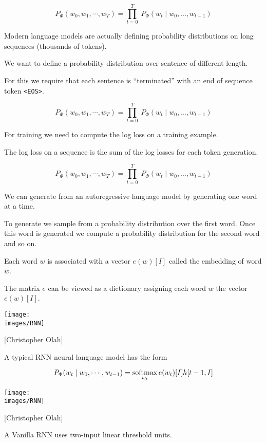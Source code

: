 {\vfill
$$P_\Phi(w_0, w_1, \cdots, w_T) = \prod_{t=0}^T\;P_\Phi(w_t\;|\;w_0,\ldots,w_{t-1})$$

\vfill
Modern language models are actually defining probability distributions on long sequences (thousands of tokens).


We want to define a probability distribution over sentence of different length.

\vfill
For this we require that each sentence is ``terminated'' with an end of sequence token {\tt <EOS>}.


$$P_\Phi(w_0, w_1, \cdots, w_T) = \prod_{t=0}^T\;P_\Phi(w_t\;|\;w_0,\ldots,w_{t-1})$$

\vfill
For training we need to compute the log loss on a training example.

\vfill
The log loss on a sequence is the sum of the log losses for each token generation.

$$P_\Phi(w_0, w_1, \cdots, w_T) = \prod_{t=0}^T\;P_\Phi(w_t\;|\;w_0,\ldots,w_{t-1})$$

\vfill
We can generate from an autoregressive language model by generating one word at a time.

\vfill
To generate we sample from a probability distribution over the first word.  Once this word is generated
we compute a probability distribution for the second word and so on.


Each word $w$ is associated with a vector $e(w)[I]$ called the embedding of word $w$.

\vfill
The matrix $e$ can be viewed as a dictionary assigning each word $w$ the vector $e(w)[I]$.


\centerline{\texttt{[image: \\images/RNN]}}
\centerline{{\large [Christopher Olah]}}

\vfill
A typical RNN neural language model has the form

$$P_\Phi(w_t\;|\;w_0,\cdots,w_{t-1}) = \operatorname*{softmax}_{w_t} e(w_t)[I]h[t-1,I]$$


\centerline{\texttt{[image: \\images/RNN]}}
\centerline{{\large [Christopher Olah]}}

A Vanilla RNN uses two-input linear threshold units.

}
